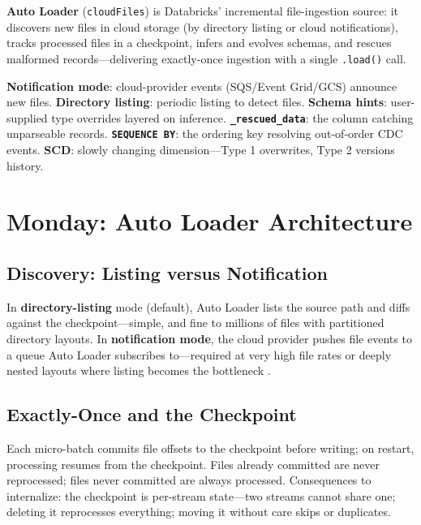 \begin{definitionbox}
\textbf{Auto Loader} (\texttt{cloudFiles}) is Databricks' incremental file-ingestion source: it discovers new files in cloud storage (by directory listing or cloud notifications), tracks processed files in a checkpoint, infers and evolves schemas, and rescues malformed records---delivering exactly-once ingestion with a single \texttt{.load()} call.
\end{definitionbox}

\begin{keyterms}
\textbf{Notification mode}: cloud-provider events (SQS/Event Grid/GCS) announce new files. \textbf{Directory listing}: periodic listing to detect files. \textbf{Schema hints}: user-supplied type overrides layered on inference. \textbf{\texttt{\_rescued\_data}}: the column catching unparseable records. \textbf{\texttt{SEQUENCE BY}}: the ordering key resolving out-of-order CDC events. \textbf{SCD}: slowly changing dimension---Type 1 overwrites, Type 2 versions history.
\end{keyterms}

\section{Monday: Auto Loader Architecture}
\subsection{Discovery: Listing versus Notification}
In \textbf{directory-listing} mode (default), Auto Loader lists the source path and diffs against the checkpoint---simple, and fine to millions of files with partitioned directory layouts. In \textbf{notification mode}, the cloud provider pushes file events to a queue Auto Loader subscribes to---required at very high file rates or deeply nested layouts where listing becomes the bottleneck \cite{databricksAutoLoader}.

\subsection{Exactly-Once and the Checkpoint}
Each micro-batch commits file offsets to the checkpoint before writing; on restart, processing resumes from the checkpoint. Files already committed are never reprocessed; files never committed are always processed. Consequences to internalize: the checkpoint is per-stream state---two streams cannot share one; deleting it reprocesses everything; moving it without care skips or duplicates.

